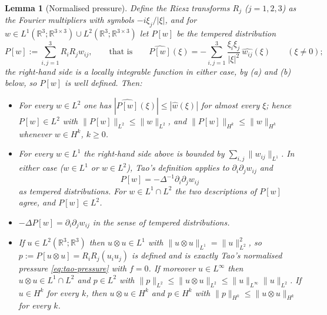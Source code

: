 \documentclass[11pt]{article}
\newtheorem{lemma}[theorem]{Lemma}
\theoremstyle{definition}
\theoremstyle{plain}
\newcommand{\R}{\mathbb R}
\newcommand{\norm}[1]{\lVert #1\rVert}
\begin{document}
\begin{lemma}[Normalised pressure]\label{lem:pressure-convention}
Define the Riesz transforms $R_j$ ($j=1,2,3$) as the Fourier multipliers
with symbols $-i\xi_j/|\xi|$, and for
$w\in L^1(\R^3;\R^{3\times3})\cup L^2(\R^3;\R^{3\times3})$ let $P[w]$ be the
tempered distribution
\[
 P[w]:=\sum_{i,j=1}^3R_iR_jw_{ij},\qquad\text{that is}\qquad
 \widehat{P[w]}(\xi)=-\sum_{i,j=1}^3\frac{\xi_i\xi_j}{|\xi|^2}\,
 \widehat{w_{ij}}(\xi)\qquad(\xi\neq0);
\]
the right-hand side is a locally integrable function in either case, by (a)
and (b) below, so $P[w]$ is well defined.  Then:
\begin{itemize}
\item[(a)] For every $w\in L^2$ one has $|\widehat{P[w]}(\xi)|\leq
|\widehat w(\xi)|$ for almost every $\xi$; hence $P[w]\in L^2$ with
$\norm{P[w]}_{L^2}\leq\norm w_{L^2}$, and $\norm{P[w]}_{H^k}\leq
\norm w_{H^k}$ whenever $w\in H^k$, $k\geq0$.
\item[(b)] For every $w\in L^1$ the right-hand side above is bounded by
$\sum_{i,j}\norm{w_{ij}}_{L^1}$.  In either case ($w\in L^1$ or $w\in L^2$),
Tao's definition \cite[(14), p.~38]{Tao2013} applies to
$\partial_i\partial_jw_{ij}$ and
\[
 P[w]=-\Delta^{-1}\partial_i\partial_jw_{ij}
\]
as tempered distributions.  For $w\in L^1\cap L^2$ the two descriptions of
$P[w]$ agree, and $P[w]\in L^2$.
\item[(c)] $-\Delta P[w]=\partial_i\partial_jw_{ij}$ in the sense of
tempered distributions.
\item[(d)] If $u\in L^2(\R^3;\R^3)$ then $u\otimes u\in L^1$ with
$\norm{u\otimes u}_{L^1}=\norm u_{L^2}^2$, so
$p:=P[u\otimes u]=R_iR_j(u_iu_j)$ is defined and is exactly Tao's normalised
pressure \eqref{eq:tao-pressure} with $f=0$.  If moreover $u\in L^\infty$
then $u\otimes u\in L^1\cap L^2$ and $p\in L^2$ with
$\norm p_{L^2}\leq\norm{u\otimes u}_{L^2}\leq
\norm u_{L^\infty}\norm u_{L^2}$.  If $u\in H^k$ for every $k$, then
$u\otimes u\in H^k$ and $p\in H^k$ with $\norm p_{H^k}\leq
\norm{u\otimes u}_{H^k}$ for every $k$.
\end{itemize}
\end{lemma}
\end{document}
